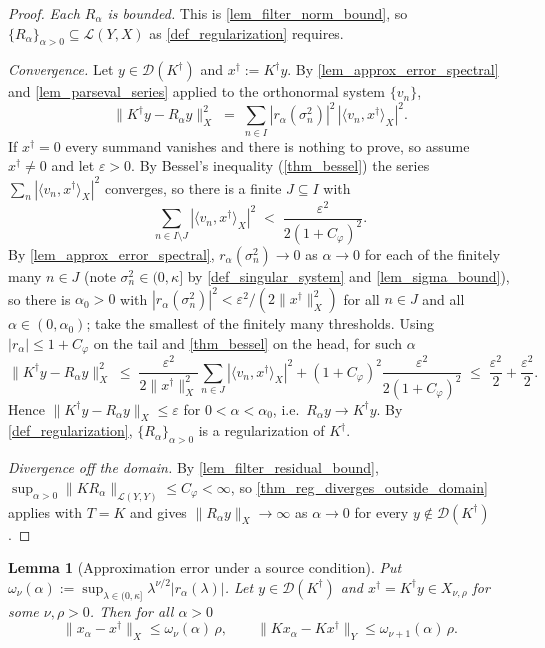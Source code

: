 \documentclass[a4paper]{report}
\theoremstyle{plain}
\newtheorem{lemma}[theorem]{Lemma}
\theoremstyle{definition}
\theoremstyle{remark}
\newcommand{\Ll}{\mathcal{L}}
\newcommand{\Dom}{\mathcal{D}}
\newcommand{\dg}{^{\dagger}}
\begin{document}
\begin{proof}
  \emph{Each $R_{\alpha}$ is bounded.}  This is \cref{lem_filter_norm_bound}, so
  $\{R_{\alpha}\}_{\alpha>0} \subseteq \Ll(Y,X)$ as \cref{def_regularization} requires.

  \emph{Convergence.}  Let $y \in \Dom(K\dg)$ and $x\dg := K\dg y$.  By
  \cref{lem_approx_error_spectral} and \cref{lem_parseval_series} applied to the
  orthonormal system $\{v_n\}$,
  \[
    \|K\dg y - R_{\alpha}y\|_X^{2} \;=\; \sum_{n \in I} |r_{\alpha}(\sigma_n^{2})|^{2}\,
      |\langle v_n, x\dg\rangle_X|^{2} .
  \]
  If $x\dg = 0$ every summand vanishes and there is nothing to prove, so assume
  $x\dg \ne 0$ and let $\varepsilon > 0$.  By Bessel's inequality (\cref{thm_bessel}) the
  series $\sum_{n} |\langle v_n,x\dg\rangle_X|^{2}$ converges, so there is a finite
  $J \subseteq I$ with
  \[
    \sum_{n \in I \setminus J} |\langle v_n, x\dg\rangle_X|^{2}
      \;<\; \frac{\varepsilon^{2}}{2(1+C_{\varphi})^{2}} .
  \]
  By \cref{lem_approx_error_spectral}, $r_{\alpha}(\sigma_n^{2}) \to 0$ as $\alpha \to 0$
  for each of the finitely many $n \in J$ (note $\sigma_n^{2} \in (0,\kappa]$ by
  \cref{def_singular_system} and \cref{lem_sigma_bound}), so there
  is $\alpha_0 > 0$ with $|r_{\alpha}(\sigma_n^{2})|^{2} < \varepsilon^{2}/(2\|x\dg\|
  _X^{2})$ for all $n \in J$ and all $\alpha \in (0,\alpha_0)$; take the smallest of the
  finitely many thresholds.  Using $|r_{\alpha}| \le 1 + C_{\varphi}$ on the tail and
  \cref{thm_bessel} on the head, for such $\alpha$
  \[
    \|K\dg y - R_{\alpha}y\|_X^{2} \;\le\; \frac{\varepsilon^{2}}{2\|x\dg\|_X^{2}}
      \sum_{n \in J}|\langle v_n,x\dg\rangle_X|^{2}
      + (1+C_{\varphi})^{2}\frac{\varepsilon^{2}}{2(1+C_{\varphi})^{2}}
      \;\le\; \frac{\varepsilon^{2}}{2} + \frac{\varepsilon^{2}}{2} .
  \]
  Hence $\|K\dg y - R_{\alpha}y\|_X \le \varepsilon$ for $0 < \alpha < \alpha_0$, i.e.\
  $R_{\alpha}y \to K\dg y$.  By \cref{def_regularization}, $\{R_{\alpha}\}_{\alpha>0}$ is
  a regularization of $K\dg$.

  \emph{Divergence off the domain.}  By \cref{lem_filter_residual_bound},
  $\sup_{\alpha>0}\|KR_{\alpha}\|_{\Ll(Y,Y)} \le C_{\varphi} < \infty$, so
  \cref{thm_reg_diverges_outside_domain} applies with $T = K$ and gives
  $\|R_{\alpha}y\|_X \to \infty$ as $\alpha \to 0$ for every $y \notin \Dom(K\dg)$.
\end{proof}


\begin{lemma}[Approximation error under a source condition]
  \label{lem_omega_nu}
  Put $\omega_{\nu}(\alpha) := \sup_{\lambda \in (0,\kappa]}
  \lambda^{\nu/2}|r_{\alpha}(\lambda)|$.  Let $y \in \Dom(K\dg)$ and $x\dg = K\dg y \in
  X_{\nu,\rho}$ for some $\nu, \rho > 0$.  Then for all $\alpha > 0$
  \[
    \|x_{\alpha} - x\dg\|_X \le \omega_{\nu}(\alpha)\,\rho,
    \qquad
    \|Kx_{\alpha} - Kx\dg\|_Y \le \omega_{\nu+1}(\alpha)\,\rho .
  \]
\end{lemma}
\end{document}
